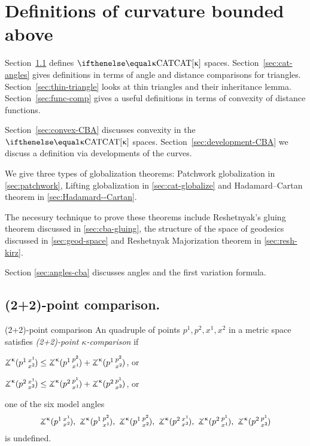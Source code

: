 
\chapter{Definitions of curvature bounded above}
Section~\ref{sec:cba-def} defines $\CAT\kappa$ spaces.  
Section~\ref{sec:cat-angles} gives definitions in terms of angle and distance comparisons for triangles.  
Section~\ref{sec:thin-triangle} looks at thin triangles and their inheritance lemma. 
Section~\ref{sec:func-comp} gives a useful definitions in terms of convexity of distance functions.

Section~\ref{sec:convex-CBA} discusses convexity in the $\CAT{\kappa}$ spaces.
Section~\ref{sec:development-CBA} we discuss a definition via developments of the curves.

We give three types of globalization theorems:
Patchwork globalization in \ref{sec:patchwork},
Lifting globalization in \ref{sec:cat-globalize}
and Hadamard--Cartan theorem in \ref{sec:Hadamard--Cartan}.

The necesury technique to prove these theorems include 
Reshetnyak's gluing theorem discussed in \ref{sec:cba-gluing},
the structure of the space of geodesics discussed in \ref{sec:geod-space}
and Reshetnyak Majorization theorem in \ref{sec:resh-kirz}.

Section \ref{sec:angles-cba} discusses angles and the first variation formula.   


\section{(2+2)-point comparison.} \label{sec:cba-def}

      
\begin{thm}{(2+2)-point comparison}\label{def:2+2}
An quadruple of points $p^1,p^2,x^1,x^2$ in a metric space 
satisfies
\emph{(2+2)-point $\kappa$-comparison} 
if
  
\begin{subthm}{}
$\angk{\kappa}{p^1}{x^1}{x^2} 
\le 
\angk{\kappa}{p^1}{p^2}{x^1}+\angk{\kappa}{p^1}{p^2}{x^2}$, or
\end{subthm}

\begin{subthm}{}
$\angk{\kappa} {p^2}{x^1}{x^2}\le \angk{\kappa} {p^2}{p^1}{x^1} + \angk{\kappa} {p^2}{p^1}{x^2}$, or
\end{subthm}

\begin{subthm}{}
one of the six model angles 
\[\angk{\kappa}{p^1}{x^1}{x^2},\ \angk{\kappa}{p^1}{p^2}{x^1},\ \angk{\kappa}{p^1}{p^2}{x^2},\ \angk{\kappa}{p^2}{x^1}{x^2},\ \angk{\kappa}{p^2}{p^1}{x^1},\ \angk{\kappa}{p^2}{p^1}{x^2}\]
is undefined.
\end{subthm}

\end{thm}

